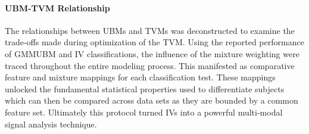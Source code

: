 \paragraph*{\ac{UBM}-\ac{TVM} Relationship}
The relationships between \acp{UBM} and \acp{TVM} was deconstructed to examine the trade-offs made during optimization of the \ac{TVM}. Using the reported performance of \ac{GMMUBM} and \ac{IV} classifications, the influence of the mixture weighting were traced throughout the entire modeling process. This manifested as comparative feature and mixture mappings for each classification test. These mappings unlocked the fundamental statistical properties used to differentiate subjects which can then be compared across data sets as they are bounded by a common feature set. Ultimately this protocol turned \acp{IV} into a powerful multi-modal signal analysis technique.